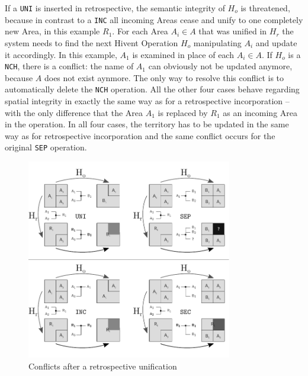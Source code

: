 If a \texttt{UNI} is inserted in retrospective, the semantic integrity of $H_o$ is threatened, because in contrast to a \texttt{INC} all incoming Areas cease and unify to one completely new Area, in this example $R_1$. For each Area $A_i \in A$ that was unified in $H_r$ the system needs to find the next Hivent Operation $H_o$ manipulating $A_i$ and update it accordingly. In this example, $A_1$ is examined in place of each $A_i \in A$. If $H_o$ is a \texttt{NCH}, there is a conflict: the name of $A_1$ can obviously not be updated anymore, because $A$ does not exist aynmore. The only way to resolve this conflict is to automatically delete the \texttt{NCH} operation. All the other four cases behave regarding spatial integrity in exactly the same way as for a retrospective incorporation -- with the only difference that the Area $A_1$ is replaced by $R_1$ as an incoming Area in the operation. In all four cases, the territory has to be updated in the same way as for retrospective incorporation and the same conflict occurs for the original \texttt{SEP} operation.

\begin{figure}[ht]
\vspace{1em}
  \centering
  \includegraphics[width=0.8\textwidth]{graphics/development/update_conflict/UNI}
  \caption{Conflicts after a retrospective unification}
  \label{fig:update_conflict_UNI}
\end{figure}


